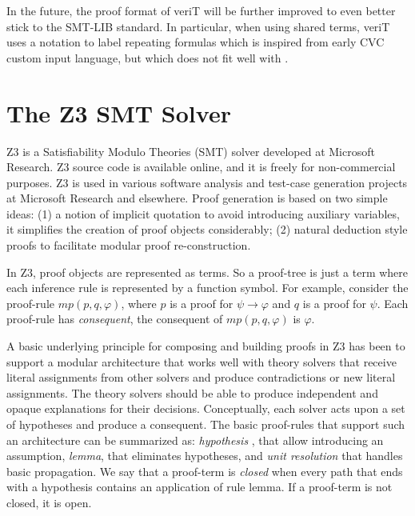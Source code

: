 \documentclass{llncs}
\begin{document}
In the future, the proof format of veriT will be further improved to even better
stick to the SMT-LIB standard.  In particular, when using shared terms, veriT
uses a notation to label repeating formulas which is inspired from early CVC custom input language, but which does not fit well with .


\section{The Z3 SMT Solver}
\label{sec:z3}

Z3 is a Satisfiability Modulo Theories (SMT) solver developed at
Microsoft Research.  Z3 source code is available online, and it is
freely for non-commercial purposes.  Z3 is used in various software
analysis and test-case generation projects at Microsoft Research and
elsewhere.  Proof generation is based on two simple ideas: (1) a
notion of implicit quotation to avoid introducing auxiliary variables,
it simplifies the creation of proof objects considerably; (2) natural
deduction style proofs to facilitate modular proof re-construction.


In Z3, proof objects are represented as terms. So a proof-tree is just a term
where each inference rule is represented by a function symbol.
For example, consider the proof-rule $mp(p, q, \varphi)$, where $p$ is a proof for
$\psi \rightarrow \varphi$ and $q$ is a proof for $\psi$. Each proof-rule has
\emph{consequent}, the consequent of $mp(p, q, \varphi)$ is $\varphi$.

A basic underlying principle for composing and building proofs in Z3 has been to support a modular
architecture that works well with theory solvers that receive literal assignments from other solvers and
produce contradictions or new literal assignments. The theory solvers should be able to produce independent
and opaque explanations for their decisions.
Conceptually, each solver acts upon a set of hypotheses and produce a consequent. The basic proof-rules
that support such an architecture can be summarized as: \emph{hypothesis} , that allow introducing an
assumption, \emph{lemma}, that eliminates hypotheses, and \emph{unit resolution} that handles basic propagation.
We say that a proof-term is \emph{closed} when every path that ends with a hypothesis contains an application
of rule lemma. If a proof-term is not closed, it is open.
\end{document}
